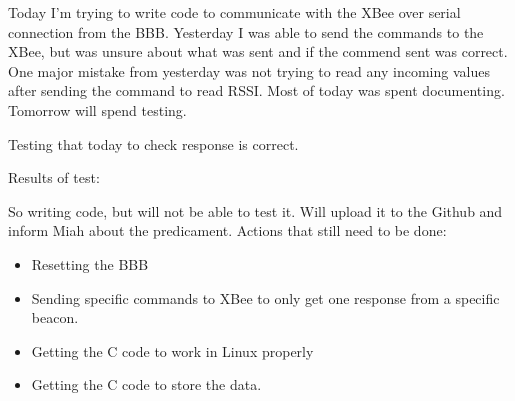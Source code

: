 \documentclass[fontsize=11pt, %
                             paper=letter, %
                             twoside, %
                             captions=tableheading,
                             index=totoc,
                             hyperref]{labbook}
\begin{document}
\begin{addmargin}[0cm]{0cm}
Today I'm trying to write code to communicate with the XBee over serial connection from the BBB. Yesterday I was able to send the commands to the XBee, but was unsure about what was sent and if the commend sent was correct. One major mistake from yesterday was not trying to read any incoming values after sending the command to read RSSI. Most of today was spent documenting. Tomorrow will spend testing.


Testing that today to check response is correct. 

Results of test: 

So writing code, but will not be able to test it. Will upload it to the Github and inform Miah about the predicament. Actions that still need to be done:

\begin{itemize}
\item Resetting the BBB
\item Sending specific commands to XBee to only get one response from a specific beacon. 
\item Getting the C code to work in Linux properly
\item Getting the C code to store the data. 
\end{itemize}



\end{addmargin}









\end{document}

